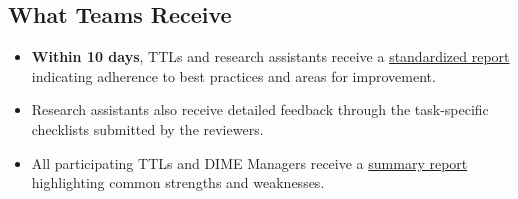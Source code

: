 \documentclass{tufte-handout}
\begin{document}
\begin{fullwidth}
\section*{What Teams Receive}
\begin{itemize}
    \item \textbf{Within 10 days}, TTLs and research assistants receive a \href{https://github.com/worldbank/dime-standards/blob/master/dime-coding-standards/checklists/samples/Sample%20TTL%20Report.pdf}{standardized report} indicating adherence to best practices and areas for improvement.
    \item Research assistants also receive detailed feedback through the task-specific checklists submitted by the reviewers.
    \item All participating TTLs and DIME Managers receive a \href{https://github.com/worldbank/dime-standards/blob/master/dime-coding-standards/checklists/samples/Peer%20Code%20Review%20Summary%20-%20FY24%20Q3.pdf}{summary report} highlighting common strengths and weaknesses.
\end{itemize}


	\end{fullwidth}
\end{document}
